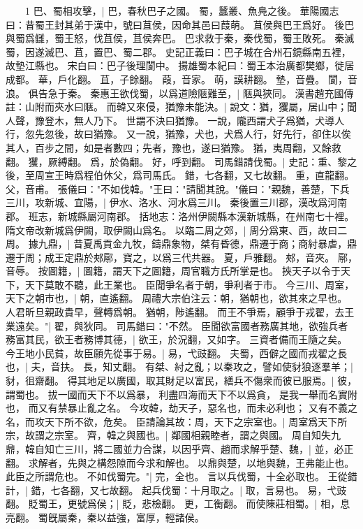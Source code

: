 　　1 巴、蜀相攻擊，|{
	巴，春秋巴子之國。
	蜀，蠶叢、魚鳧之後。
	華陽國志曰：昔蜀王封其弟于漢中，號曰苴侯，因命其邑曰葭萌。
	苴侯與巴王爲好。
	後巴與蜀爲讎，蜀王怒，伐苴侯，苴侯奔巴。
	巴求救于秦，秦伐蜀，蜀王敗死。
	秦滅蜀，因遂滅巴、苴，置巴、蜀二郡。
	史記正義曰：巴子城在合州石鏡縣南五裡，故墊江縣也。
	宋白曰：巴子後理閬中。
	揚雄蜀本紀曰：蜀王本治廣都樊鄉，徙居成都。
	華，戶化翻。
	苴，子餘翻。
	葭，音家。
	萌，謨耕翻。
	墊，音疊。
	閬，音浪。
}
俱告急于秦。
	秦惠王欲伐蜀，以爲道險陿難至，|{
	陿與狹同。
	漢書趙充國傳註：山附而夾水曰陿。
}
而韓又來侵，猶豫未能決。|{
	說文：猶，玃屬，居山中；聞人聲，豫登木，無人乃下。
	世謂不決曰猶豫。
	一說，隴西謂犬子爲猶，犬導人行，忽先忽後，故曰猶豫。
	又一說，猶豫，犬也，犬爲人行，好先行，卻住以俟其人，百步之間，如是者數四；先者，豫也，遂曰猶豫。
	猶，夷周翻，又餘救翻。
	玃，厥縛翻。
	爲，於偽翻。
	好，呼到翻。
}
司馬錯請伐蜀。|{
	史記：重、黎之後，至周宣王時爲程伯休父，爲司馬氏。
	錯，七各翻，又七故翻。
	重，直龍翻。
	父，音甫。
}
張儀曰："不如伐韓。"王曰："請聞其說。"儀曰："親魏，善楚，下兵三川，攻新城、宜陽，|{
	伊水、洛水、河水爲三川。
	秦後置三川郡，漢改爲河南郡。
	班志，新城縣屬河南郡。
	括地志：洛州伊闕縣本漢新城縣，在州南七十裡。
	隋文帝改新城爲伊闕，取伊闕山爲名。
}
以臨二周之郊，|{
	周分爲東、西，故曰二周。
}
據九鼎，|{
	昔夏禹貢金九牧，鑄鼎象物，桀有昏德，鼎遷于商；商紂暴虐，鼎遷于周；成王定鼎於郟鄏，寶之，以爲三代共器。
	夏，戶雅翻。
	郟，音夾。
	鄏，音辱。
}
按圖籍，|{
	圖籍，謂天下之圖籍，周官職方氏所掌是也。
}
挾天子以令于天下，天下莫敢不聽，此王業也。
	臣聞爭名者于朝，爭利者于市。
	今三川、周室，天下之朝市也，|{
	朝，直遙翻。
	周禮大宗伯注云：朝，猶朝也，欲其來之早也。
	人君昕旦親政貴早，聲轉爲朝。
	猶朝，陟遙翻。
}
而王不爭焉，顧爭于戎翟，去王業遠矣。"|{
	翟，與狄同。
}
司馬錯曰："不然。
	臣聞欲富國者務廣其地，欲強兵者務富其民，欲王者務博其德，|{
	欲王，於況翻，又如字。
}
三資者備而王隨之矣。
	今王地小民貧，故臣願先從事于易。|{
	易，弋豉翻。
}
夫蜀，西僻之國而戎翟之長也，|{
	夫，音扶。
	長，知丈翻。
}
有桀、紂之亂；以秦攻之，譬如使豺狼逐羣羊；|{
	豺，徂齋翻。
}
得其地足以廣國，取其財足以富民，繕兵不傷衆而彼已服焉。|{
	彼，謂蜀也。
}
拔一國而天下不以爲暴，
利盡四海而天下不以爲貪，
是我一舉而名實附也，
而又有禁暴止亂之名。
今攻韓，劫天子，惡名也，而未必利也；
又有不義之名，而攻天下所不欲，危矣。
臣請論其故：周，天下之宗室也。|{
	周室爲天下所宗，故謂之宗室。
}
齊，韓之與國也。|{
	鄰國相親睦者，謂之與國。
}
周自知失九鼎，韓自知亡三川，將二國並力合謀，以因乎齊、趙而求解乎楚、魏，|{
	並，必正翻。
	求解者，先與之構怨隙而今求和解也。
}
以鼎與楚，以地與魏，王弗能止也。
	此臣之所謂危也。
	不如伐蜀完。"|{
	完，全也。
	言以兵伐蜀，十全必取也。
}
王從錯計，|{
	錯，七各翻，又七故翻。
}
起兵伐蜀：十月取之。|{
	取，言易也。
	易，弋豉翻。
}
貶蜀王，更號爲侯；|{
	貶，悲檢翻。
	更，工衡翻。
}
而使陳莊相蜀。|{
	相，息亮翻。
}
蜀旣屬秦，秦以益強，富厚，輕諸侯。


